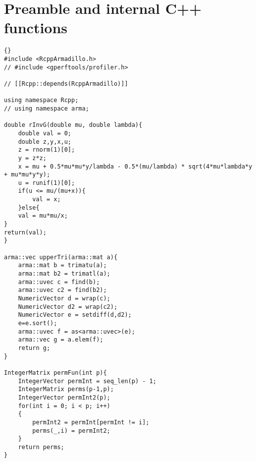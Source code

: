 \lstset{language=C++, linewidth=6in, breaklines=true, 
  breakatwhitespace=true, breakindent=5pt, postbreak=\space}
\section{Preamble and internal C++ functions}
\begin{lstlisting}{}
#include <RcppArmadillo.h>
// #include <gperftools/profiler.h>

// [[Rcpp::depends(RcppArmadillo)]]

using namespace Rcpp;
// using namespace arma; 

double rInvG(double mu, double lambda){
	double val = 0;
	double z,y,x,u;
	z = rnorm(1)[0];
	y = z*z;
	x = mu + 0.5*mu*mu*y/lambda - 0.5*(mu/lambda) * sqrt(4*mu*lambda*y + mu*mu*y*y);
	u = runif(1)[0];
	if(u <= mu/(mu+x)){
		val = x;
	}else{
	val = mu*mu/x;
}
return(val);
}

arma::vec upperTri(arma::mat a){
	arma::mat b = trimatu(a);
	arma::mat b2 = trimatl(a);
	arma::uvec c = find(b);
	arma::uvec c2 = find(b2);
	NumericVector d = wrap(c);
	NumericVector d2 = wrap(c2);
	NumericVector e = setdiff(d,d2);
	e=e.sort();
	arma::uvec f = as<arma::uvec>(e);
	arma::vec g = a.elem(f);
	return g; 
}

IntegerMatrix permFun(int p){
	IntegerVector permInt = seq_len(p) - 1;
	IntegerMatrix perms(p-1,p);
	IntegerVector permInt2(p);
	for(int i = 0; i < p; i++)
	{
		permInt2 = permInt[permInt != i];
		perms(_,i) = permInt2;
	}
	return perms;
}
\end{lstlisting}

